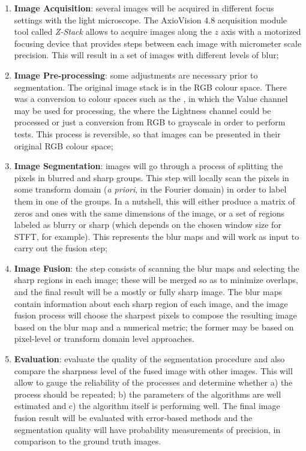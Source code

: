 \begin{enumerate}[label=\Roman*.]
    \item \textbf{Image Acquisition}: several images will be acquired in different focus settings with the light microscope. The AxioVision 4.8 acquisition module tool called \emph{Z-Stack} allows to acquire images along the $z$ axis with a motorized focusing device that provides steps between each image with micrometer scale precision. This will result in a set of images with different levels of blur;
    
    \item \textbf{Image Pre-processing}: some adjustments are necessary prior to segmentation. The original image stack is in the RGB colour space. There was a conversion to colour spaces such as the , in which the Value channel may be used for processing, the  where the Lightness channel could be processed or just a conversion from RGB to grayscale in order to perform tests. This process is reversible, so that images can be presented in their original RGB colour space;
    
    \item \textbf{Image Segmentation}: images will go through a process of splitting the pixels in blurred and sharp groups. This step will locally scan the pixels in some transform domain (\textit{a priori}, in the Fourier domain) in order to label them in one of the groups. In a nutshell, this will either produce a matrix of zeros and ones with the same dimensions of the image, or a set of regions labeled as blurry or sharp (which depends on the chosen window size for STFT, for example). This represents the blur maps and will work as input to carry out the fusion step;
    
    \item \textbf{Image Fusion}: the step consists of scanning the blur maps and selecting the sharp regions in each image; these will be merged so as to minimize overlaps, and the final result will be a mostly or fully sharp image. The blur maps contain information about each sharp region of each image, and the image fusion process will choose the sharpest pixels to compose the resulting image based on the blur map and a numerical metric; the former may be based on pixel-level or transform domain level approaches.
    
    \item \textbf{Evaluation}:  evaluate the quality of the segmentation procedure and also compare the sharpness level of the fused image with other images. This will allow to gauge the reliability of the processes and determine whether a) the process should be repeated; b) the parameters of the algorithms are well estimated and c) the algorithm itself is performing well. The final image fusion result will be evaluated with error-based methods and the segmentation quality will have probability measurements of precision, in comparison to the ground truth images. 
\end{enumerate}

